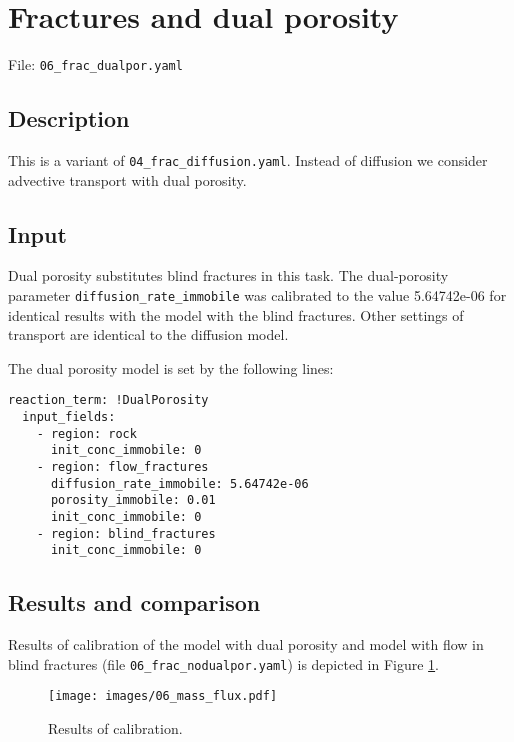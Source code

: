 \section{Fractures and dual porosity}\label{fractures-and-dual-porosity}

File: \texttt{06\_frac\_dualpor.yaml}

\subsection{Description}\label{description}

This is a variant of \texttt{04\_frac\_diffusion.yaml}. Instead of
diffusion we consider advective transport with dual porosity.

\subsection{Input}\label{input}

Dual porosity substitutes blind fractures in this task. The
dual-porosity parameter \texttt{diffusion\_rate\_immobile} was
calibrated to the value 5.64742e-06 for identical results with the model
with the blind fractures. Other settings of transport are identical to
the diffusion model.

The dual porosity model is set by the following lines:

\begin{verbatim}
reaction_term: !DualPorosity
  input_fields:
    - region: rock
      init_conc_immobile: 0
    - region: flow_fractures
      diffusion_rate_immobile: 5.64742e-06
      porosity_immobile: 0.01
      init_conc_immobile: 0
    - region: blind_fractures
      init_conc_immobile: 0
\end{verbatim}

\subsection{Results and comparison}\label{results-and-comparison}

Results of calibration of the model with dual porosity and model with
flow in blind fractures (file \texttt{06\_frac\_nodualpor.yaml}) is
depicted in Figure \ref{fig:calib}.

\begin{figure}[htbp]
\centering
\texttt{[image: images/06\_mass\_flux.pdf]}
\caption{Results of calibration.\label{fig:calib}}
\end{figure}
